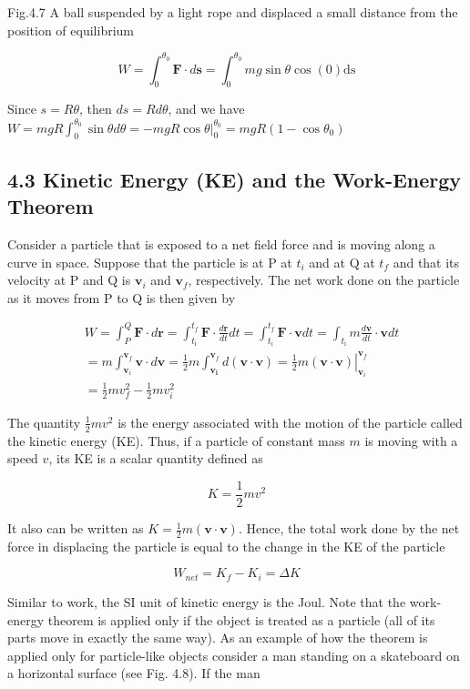 \documentclass[10pt]{article}
\begin{document}
Fig.4.7 A ball suspended by a light rope and displaced a small distance from the position of equilibrium

$$
W=\int_{0}^{\theta_{0}} \mathbf{F} \cdot d \mathbf{s}=\int_{0}^{\theta_{0}} m g \sin \theta \cos (0) \mathrm{ds}
$$

Since $s=R \theta$, then $d s=R d \theta$, and we have $W=m g R \int_{0}^{\theta_{0}} \sin \theta d \theta=-\left.m g R \cos \theta\right|_{0} ^{\theta_{0}}=m g R\left(1-\cos \theta_{0}\right)$

\subsection*{4.3 Kinetic Energy (KE) and the Work-Energy Theorem}
Consider a particle that is exposed to a net field force and is moving along a curve in space. Suppose that the particle is at P at $t_{i}$ and at Q at $t_{f}$ and that its velocity at P and Q is $\mathbf{v}_{i}$ and $\mathbf{v}_{f}$, respectively. The net work done on the particle as it moves from P to Q is then given by

$$
\begin{aligned}
& W=\int_{P}^{Q} \mathbf{F} \cdot d \mathbf{r}=\int_{t_{\mathrm{i}}}^{t_{f}} \mathbf{F} \cdot \frac{d \mathbf{r}}{d t} d t=\int_{t_{i}}^{t_{f}} \mathbf{F} \cdot \mathbf{v} d t=\int_{t_{\mathrm{i}}} m \frac{d \mathbf{v}}{d t} \cdot \mathbf{v} d t \\
& =m \int_{\mathbf{v}_{i}}^{\mathbf{v}_{f}} \mathbf{v} \cdot d \mathbf{v}=\frac{1}{2} m \int_{\mathbf{v}_{\mathbf{i}}}^{\mathbf{v}_{f}} d(\mathbf{v} \cdot \mathbf{v})=\left.\frac{1}{2} m(\mathbf{v} \cdot \mathbf{v})\right|_{\mathbf{v}_{i}} ^{\mathbf{v}_{f}} \\
& =\frac{1}{2} m v_{f}^{2}-\frac{1}{2} m v_{i}^{2}
\end{aligned}
$$

The quantity $\frac{1}{2} m v^{2}$ is the energy associated with the motion of the particle called the kinetic energy (KE). Thus, if a particle of constant mass $m$ is moving with a speed $v$, its KE is a scalar quantity defined as

$$
K=\frac{1}{2} m v^{2}
$$

It also can be written as $K=\frac{1}{2} m(\mathbf{v} \cdot \mathbf{v})$. Hence, the total work done by the net force in displacing the particle is equal to the change in the KE of the particle

$$
W_{n e t}=K_{f}-K_{i}=\Delta K
$$

Similar to work, the SI unit of kinetic energy is the Joul. Note that the work-energy theorem is applied only if the object is treated as a particle (all of its parts move in exactly the same way). As an example of how the theorem is applied only for particle-like objects consider a man standing on a skateboard on a horizontal surface (see Fig. 4.8). If the man
\end{document}
